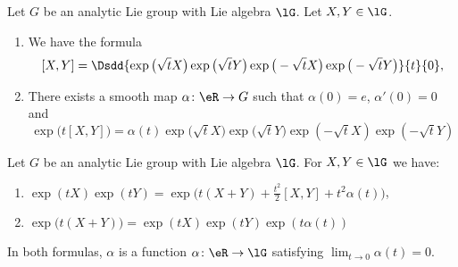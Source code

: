 \begin{lemma}        \label{LEMooGMMNooVlDkNm}
	Let \( G\) be an analytic Lie group with Lie algebra \( \lG\). Let \( X,Y\in \lG\).
	\begin{enumerate}
		\item
		      We have the formula
		      \begin{equation}        \label{EQooDCUJooYDDZHD}
			      [X,Y]=\Dsdd{ \exp\big( \sqrt{ t }X \big)\exp\big( \sqrt{ t }Y \big)\exp\big( -\sqrt{ t }X \big)\exp\big( -\sqrt{ t }Y \big) }{t}{0},
		      \end{equation}
		\item
		      There exists a smooth map \( \alpha\colon \eR\to G\) such that \( \alpha(0)=e\), \( \alpha'(0)=0\) and
		      \begin{equation}
			      \exp\big( t[X,Y] \big)=\alpha(t)\exp\big( \sqrt{ t }X \big)\exp\big( \sqrt{ t }Y \big)\exp(-\sqrt{ t }X)\exp(-\sqrt{ t }Y)
		      \end{equation}
	\end{enumerate}
\end{lemma}

\begin{lemma}     \label{LEMooMJBRooMOuJpa}
	Let \( G\) be an analytic Lie group with Lie algebra \( \lG\). For \( X,Y\in \lG\) we have:
	\begin{enumerate}
		\item       \label{ITEMooHVOIooKDrUSw}
		      \( \exp(tX)\exp(tY)=\exp\big( t(X+Y)+\frac{ t^2 }{2}[X,Y]+t^2\alpha(t) \big)\),
		\item       \label{ITEMooWIQIooHphJcP}
		      \( \exp\big( t(X+Y) \big)=\exp(tX)\exp(tY)\exp(t\alpha(t))\)
	\end{enumerate}
	In both formulas, \( \alpha\) is a function \( \alpha\colon \eR\to \lG\) satisfying \( \lim_{t\to 0} \alpha(t)=0\).
\end{lemma}

